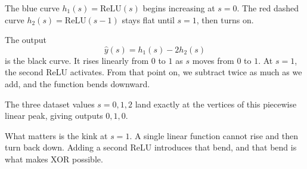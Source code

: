 \bigskip

The blue curve $h_1(s)=\mathrm{ReLU}(s)$ begins increasing at $s=0$.  
The red dashed curve $h_2(s)=\mathrm{ReLU}(s-1)$ stays flat until $s=1$, then turns on.

The output
\[
\hat y(s)=h_1(s)-2h_2(s)
\]
is the black curve. It rises linearly from $0$ to $1$ as $s$ moves from $0$ to $1$.  
At $s=1$, the second ReLU activates. From that point on, we subtract twice as much as we add, and the function bends downward.

The three dataset values $s=0,1,2$ land exactly at the vertices of this piecewise linear peak, giving outputs $0,1,0$.

\medskip

What matters is the kink at $s=1$.  
A single linear function cannot rise and then turn back down.  
Adding a second ReLU introduces that bend, and that bend is what makes XOR possible.

